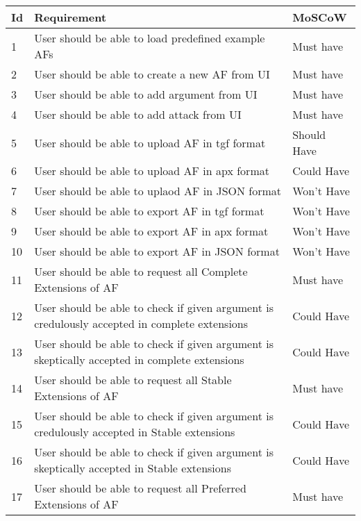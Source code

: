 \begin{longtable}[c]{|p{0.5cm}|p{10cm}|p{2.5cm}|}
	\hline
	\textbf{Id} & \textbf{Requirement} & \textbf{MoSCoW} \\ \hline \hline
	\endfirsthead
	\endhead
	1 & User should be able to load predefined example AFs & Must have \\ \hline
	2 & User should be able to create a new AF from UI & Must have \\ \hline
	3 & User should be able to add argument from UI & Must have \\ \hline
	4 & User should be able to add attack from UI & Must have \\ \hline
	5 & User should be able to upload AF in tgf format & Should Have \\ \hline
	6 & User should be able to upload AF in apx format & Could Have \\ \hline
	7 & User should be able to uplaod AF in JSON format & Won't Have \\ \hline
	8 & User should be able to export AF in tgf format & Won't Have \\ \hline
	9 & User should be able to export AF in apx format & Won't Have \\ \hline
	10 & User should be able to export AF in JSON format & Won't Have \\ \hline
	11 & User should be able to request all Complete Extensions of AF & Must have \\ \hline
	12 & User should be able to check if given argument is credulously accepted in complete extensions & Could Have \\ \hline
	13 & User should be able to check if given argument is skeptically accepted in complete extensions & Could Have \\ \hline
	14 & User should be able to request all Stable Extensions of AF & Must have \\ \hline
	15 & User should be able to check if given argument is credulously accepted in Stable extensions & Could Have \\ \hline
	16 & User should be able to check if given argument is skeptically accepted in Stable extensions & Could Have \\ \hline
	17 & User should be able to request all Preferred Extensions of AF & Must have \\ \hline

\end{longtable}
